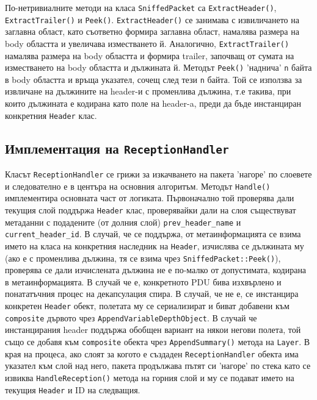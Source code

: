 \documentclass[12pt,a4paper,oneside]{book}
\begin{document}
По-нетривиалните методи на класа \texttt{SniffedPacket} са
\texttt{ExtractHeader()}, \texttt{ExtractTrailer()} и \texttt{Peek()}.
\texttt{ExtractHeader()} се занимава с извиличането на заглавна област, като
съответно формира заглавна област, намалява размера на body областта и увеличава
изместването й.
Аналогично, \texttt{ExtractTrailer()} намалява размера на body
областта и формира trailer, започващ от сумата на изместването на body областта
и дължината й. Методът \texttt{Peek()} 'наднича' \texttt{n} байта в body
областта и връща указател, сочещ след тези \texttt{n} байта. Той се използва за извличане на дължините
на header-и с променлива дължина, т.е такива, при които дължината е кодирана 
като поле на header-a, преди да бъде инстанциран конкретния \texttt{Header} клас.

\subsection{Имплементация на \texttt{ReceptionHandler}}

Класът \texttt{ReceptionHandler} се грижи за изкачването на пакета 'нагоре' по
слоевете и следователно е в центъра на основния алгоритъм.  Методът
\texttt{Handle()} имплементира основната част от логиката. Първоначално той
проверява дали текущия слой поддържа \texttt{Header} клас, проверявайки дали
на слоя съществуват метаданни с подадените (от долния слой) \texttt{prev\_header\_name} и
\texttt{current\_header\_id}. В случай, че се поддържа, от метаинформацията се
взима името на класа на конкретния наследник на \texttt{Header}, изчислява се
дължината му (ако е с променлива дължина, тя се взима чрез
\texttt{SniffedPacket::Peek()}), проверява се дали изчислената дължина не е по-малко от
допустимата, кодирана в метаинформацията. В случай че е, конкретното PDU бива
изхвърлено и понататъчния процес на декапсулация спира. В случай, че не е, се
инстанцира конкретен \texttt{Header} обект, полетата му се сериализират и биват
добавени към \texttt{composite} дървото чрез \texttt{AppendVariableDepthObject}.
В случай че инстанцирания header поддържа обобщен вариант на някои негови
полета, той също се добавя към \texttt{composite} обекта чрез
\texttt{AppendSummary()}
метода на \texttt{Layer}. В края на процеса, ако слоят за когото е създаден
\texttt{ReceptionHandler} обекта има указател към слой над него, пакета
продължава пътят си 'нагоре' по стека като се извиква \texttt{HandleReception()}
метода на горния слой и му се подават името на текущия \texttt{Header} и ID на
следващия.
\end{document}
